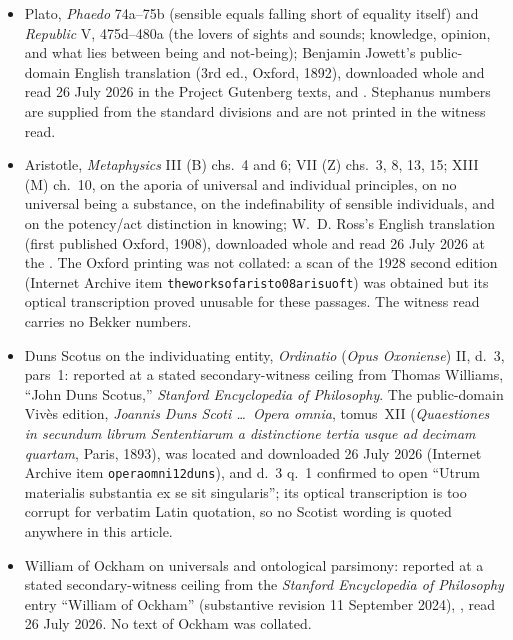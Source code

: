 {\fontsize{8.6}{9.6}\selectfont
\begin{itemize}[itemsep=0pt,parsep=0pt,topsep=0.05em]
\item Plato, \emph{Phaedo} 74a--75b (sensible equals falling short of equality itself) and \emph{Republic} V, 475d--480a (the lovers of sights and sounds; knowledge, opinion, and what lies between being and not-being); Benjamin Jowett's public-domain English translation (3rd ed., Oxford, 1892), downloaded whole and read 26 July 2026 in the Project Gutenberg texts,  and . Stephanus numbers are supplied from the standard divisions and are not printed in the witness read.
\item Aristotle, \emph{Metaphysics} III (B) chs.~4 and 6; VII (Z) chs.~3, 8, 13, 15; XIII (M) ch.~10, on the aporia of universal and individual principles, on no universal being a substance, on the indefinability of sensible individuals, and on the potency/act distinction in knowing; W.~D. Ross's English translation (first published Oxford, 1908), downloaded whole and read 26 July 2026 at the . The Oxford printing was not collated: a scan of the 1928 second edition (Internet Archive item \texttt{theworksofaristo08arisuoft}) was obtained but its optical transcription proved unusable for these passages. The witness read carries no Bekker numbers.
\item Duns Scotus on the individuating entity, \emph{Ordinatio} (\emph{Opus Oxoniense}) II, d.~3, pars~1: reported at a stated secondary-witness ceiling from Thomas Williams, ``John Duns Scotus,'' \emph{Stanford Encyclopedia of Philosophy}. The public-domain Vivès edition, \emph{Joannis Duns Scoti \ldots\ Opera omnia}, tomus~XII (\emph{Quaestiones in secundum librum Sententiarum a distinctione tertia usque ad decimam quartam}, Paris, 1893), was located and downloaded 26 July 2026 (Internet Archive item \texttt{operaomni12duns}), and d.~3 q.~1 confirmed to open ``Utrum materialis substantia ex se sit singularis''; its optical transcription is too corrupt for verbatim Latin quotation, so no Scotist wording is quoted anywhere in this article.
\item William of Ockham on universals and ontological parsimony: reported at a stated secondary-witness ceiling from the \emph{Stanford Encyclopedia of Philosophy} entry ``William of Ockham'' (substantive revision 11 September 2024), , read 26 July 2026. No text of Ockham was collated.
\end{itemize}}

